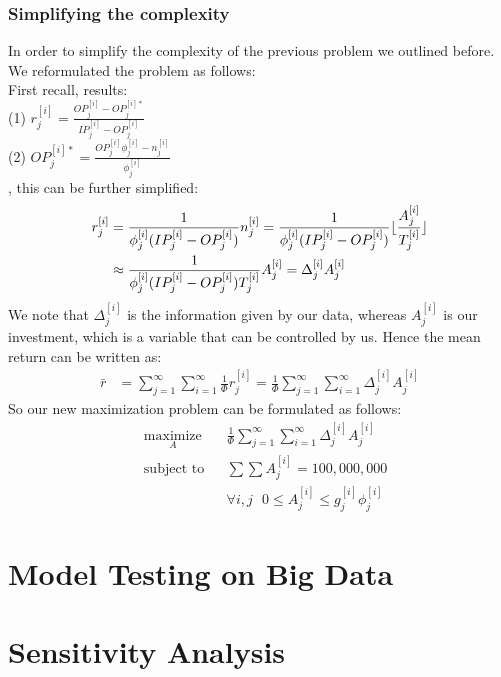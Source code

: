 \documentclass[12pt]{scrartcl}
\DeclarePairedDelimiter\floor{\lfloor}{\rfloor}
\begin{document}
	\subsubsection{Simplifying the complexity}
		In order to simplify the complexity of the previous problem we outlined before. We reformulated the problem as follows:\\
		First recall, results:\\
		(1) $r_j^{[i]} = \frac{ OP_j^{[i]} - OP_j^{[i]*}  }{ IP_j^{[i]} - 
		OP_j^{[i]}  }$\\
		(2) $OP_j^{[i]*} = \frac{  OP_j^{[i]}\phi_j^{[i]}-n_j^{[i]}  }{ \phi_j^{[i]}  }$\\
		, this can be further simplified:
		\begin{align*}
			r_j^{[i]} &= \frac{1 }{ \phi_j^{[i]} (IP_j^{[i]} - OP_j^{[i]} ) } n_j^{[i]} = \frac{1 }{ \phi_j^{[i]} (IP_j^{[i]} - OP_j^{[i]} ) }\floor{\frac{A_j^{[i]}}{T_j^{[i]}}} \\
				&\approx \frac{1}{ 
					\phi_j^{[i]} 
						(IP_j^{[i]} - OP_j^{[i]}) T_j^{[i]} 
					} A_j^{[i]} 
				= \Delta_j^{[i]}A_j^{[i]}
		\end{align*}	
		We note that $\Delta_j^{[i]}$ is the information given by our data, whereas $A_j^{[i]}$ is our investment, which is a variable that can be controlled by us.
		Hence the mean return can be written as:
		\begin{align*}
			\bar{r} &= \sum_{j=1}^\infty\sum_{i=1}^\infty \frac{ 1  }{ \Phi } r_j^{[i]} = \frac{ 1  }{ \Phi }\sum_{j=1}^\infty\sum_{i=1}^\infty \Delta_j^{[i]}A_j^{[i]}
		\end{align*}
		So our new maximization problem can be formulated as follows:
		\begin{equation*}
				\begin{aligned}
					& \underset{A}{\text{maximize}}
					& &\frac{ 1  }{ \Phi }\sum_{j=1}^\infty\sum_{i=1}^\infty \Delta_j^{[i]}A_j^{[i]}\\
					& \text{subject to}
					& & \sum \sum A_j^{[i]} = 100,000,000\\
					&&& \forall i,j \ \ \ 0\le A_j^{[i]} \le g_j^{[i]}\phi_j^{[i]}
				\end{aligned}	
		\end{equation*}
		
\section{Model Testing on Big Data} 

\section{Sensitivity Analysis} 
\end{document}
